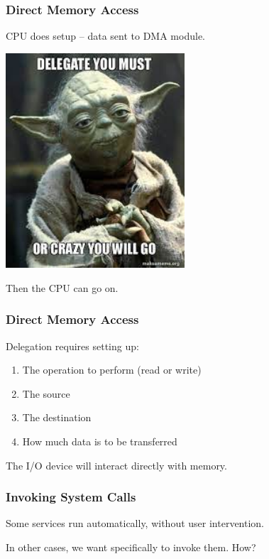 \begin{frame}
\frametitle{Direct Memory Access}

CPU does setup -- data sent to DMA module.

\begin{center}
	\includegraphics[width=0.5\textwidth]{images/delegate.jpg}
\end{center}

Then the CPU can go on.

\end{frame}


\begin{frame}
\frametitle{Direct Memory Access}

Delegation requires setting up:

\begin{enumerate}
	\item The operation to perform (read or write)
	\item The source
	\item The destination
	\item How much data is to be transferred
\end{enumerate}

The I/O device will interact directly with memory.


\end{frame}


\begin{frame}
	\frametitle{Invoking System Calls}

	Some services run automatically, without user intervention.

	In other cases, we want specifically to invoke them. How?

\end{frame}


